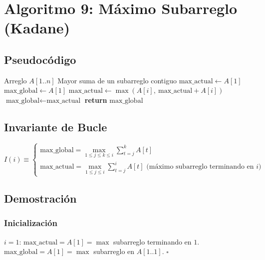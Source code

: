 \documentclass[11pt,a4paper]{article}
\newcommand{\inv}{I}
\begin{document}
\newpage

\section{Algoritmo 9: Máximo Subarreglo (Kadane)}

\subsection{Pseudocódigo}
\begin{algorithm}[H]
\caption{Máximo Subarreglo (Kadane)}
\begin{algorithmic}[1]
\Require Arreglo $A[1..n]$
\Ensure Mayor suma de un subarreglo contiguo
\State $\text{max\_actual} \gets A[1]$
\State $\text{max\_global} \gets A[1]$
    \State $\text{max\_actual} \gets \max(A[i],\ \text{max\_actual} + A[i])$
        \State $\text{max\_global} \gets \text{max\_actual}$
    \EndIf
\EndFor
\State \textbf{return} $\text{max\_global}$
\end{algorithmic}
\end{algorithm}

\subsection{Invariante de Bucle}
\[
\boxed{\inv(i) \equiv \begin{cases}
\text{max\_global} = \max_{1 \leq j \leq k \leq i} \sum_{t=j}^{k} A[t]\\
\text{max\_actual} = \max_{1 \leq j \leq i} \sum_{t=j}^{i} A[t] \text{ (máximo subarreglo terminando en } i\text{)}
\end{cases}}
\]

\subsection{Demostración}

\subsubsection{Inicialización}
$i = 1$: $\text{max\_actual} = A[1] = \max$ subarreglo terminando en $1$. $\text{max\_global} = A[1] = \max$ subarreglo en $A[1..1]$. $\square$
\end{document}
